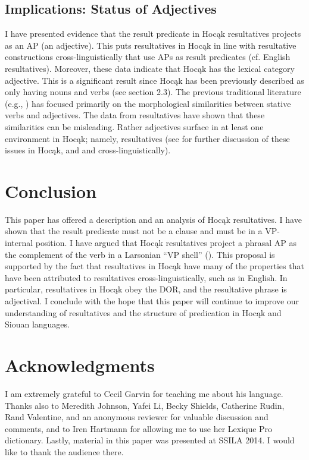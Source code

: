 \documentclass[output=paper]{LSP/langsci}
\begin{document}
\subsection{Implications: Status of Adjectives}

I have presented evidence that the result predicate in Hocąk resultatives projects as an AP (an adjective). This puts resultatives in Hocąk in line with resultative constructions cross-linguistically that use APs as result predicates (cf. English resultatives). Moreover, these data indicate that Hocąk has the lexical category adjective. This is a significant result since Hocąk has been previously described as only having nouns and verbs (see section 2.3). The previous traditional literature (e.g., \citealt{Helmbrecht2006b}) has focused primarily on the morphological similarities between stative verbs and adjectives. The data from resultatives have shown that these similarities can be misleading. Rather adjectives surface in at least one environment in Hocąk; namely, resultatives (see \citealt{Rosen2014,Rosen2015} for further discussion of these issues in Hocąk, and \citealt{Baker2003} and \citealt{Dixon2004} cross-linguistically).

\section{Conclusion}\label{sec:rosen:6}
This paper has offered a description and an analysis of Hocąk resultatives. I have shown that the result predicate must not be a clause and must be in a VP-internal position. I have argued that Hocąk resultatives project a phrasal AP as the complement of the verb in a Larsonian ``VP shell'' (\citealt{Larson1988}). This proposal is supported by the fact that resultatives in Hocąk have many of the properties that have been attributed to resultatives cross-linguistically, such as in English. In particular, resultatives in Hocąk obey the DOR, and the resultative phrase is adjectival. I conclude with the hope that this paper will continue to improve our understanding of resultatives and the structure of predication in Hocąk and Siouan languages.

\section* {Acknowledgments}
I am extremely grateful to Cecil Garvin for teaching me about his language. Thanks also to Meredith Johnson, Yafei Li, Becky Shields, Catherine Rudin, Rand Valentine, and an anonymous reviewer for valuable discussion and comments, and to Iren Hartmann for allowing me to use her Lexique Pro dictionary. Lastly, material in this paper was presented at SSILA 2014. I would like to thank the audience there.
\end{document}
